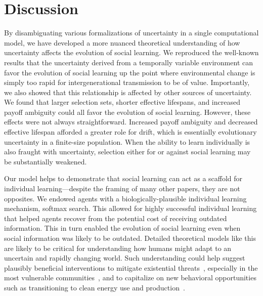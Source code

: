 \documentclass[letterpaper,11.5pt]{scrartcl}
\begin{document}
\section{Discussion}

By disambiguating various formalizations of uncertainty in a single computational model, we have developed a more nuanced theoretical understanding of how uncertainty affects the evolution of social learning.
We reproduced the well-known results that the uncertainty derived from a temporally variable environment can favor the evolution of social learning up the point where environmental change is simply too rapid for intergenerational transmission to be of value. Importantly, we also showed that this relationship is affected by other sources of uncertainty. 
We found that larger selection sets, shorter effective lifespans, and increased payoff ambiguity could all favor the evolution of social learning. However, these effects were not always straightforward. 
Increased payoff ambiguity and decreased effective lifespan afforded a greater role for drift, which is essentially
evolutionary uncertainty in a finite-size population. When the ability to learn individually is also fraught with uncertainty, selection either for or against social learning may be substantially weakened. 

Our model helps to demonstrate that social learning can act as a scaffold for individual learning---despite the framing of many other papers, they are not opposites. 
We endowed agents with a biologically-plausible individual learning mechanism, softmax search. This allowed for highly successful individual learning that helped agents recover from the potential cost of receiving outdated information. This in turn enabled the evolution of social learning 
even when social information was likely to be outdated. 
Detailed theoretical models like this are likely to be critical for understanding how humans might adapt to an uncertain and rapidly changing world.
Such understanding could help suggest plausibly beneficial interventions to mitigate existential threats~\cite{Moya2020,Jones2021}, especially in
the most vulnerable communities~\cite{McNamara2020}, and to capitalize on new behavioral opportunities such as transitioning to clean energy use and
production~\cite{NatureEnergyEditorialPromisesPremises2018,Brisbois2022}.
\end{document}
